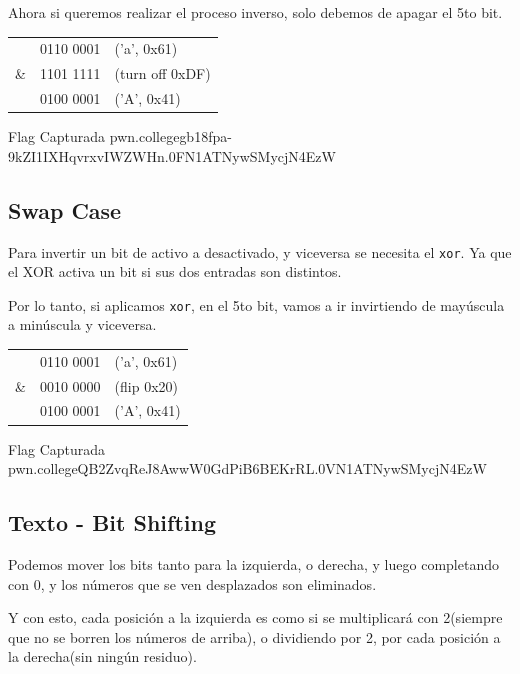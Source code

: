 Ahora si queremos realizar el proceso inverso, solo debemos de apagar el 5to bit.

\begin{center}
	\begin{tabular}{lcl}
		   & 0110 0001 & ('a', 0x61)     \\
		\& & 1101 1111 & (turn off 0xDF) \\
		\midrule
		   & 0100 0001 & ('A', 0x41)
	\end{tabular}
\end{center}

\begin{flagbox}{Flag Capturada}
	pwn.college{gb18fpa-9kZI1IXHqvrxvIWZWHn.0FN1ATNywSMycjN4EzW}
\end{flagbox}

\subsection{Swap Case}\label{subsec:swap_case}

Para invertir un bit de activo a desactivado, y viceversa se necesita el \texttt{xor}.
Ya que el XOR activa un bit si sus dos entradas son distintos.

Por lo tanto, si aplicamos \texttt{xor}, en el 5to bit, vamos a ir invirtiendo de mayúscula a minúscula
y viceversa.

\begin{center}
	\begin{tabular}{lcl}
		   & 0110 0001 & ('a', 0x61) \\
		\& & 0010 0000 & (flip 0x20) \\
		\midrule
		   & 0100 0001 & ('A', 0x41)
	\end{tabular}
\end{center}

\begin{flagbox}{Flag Capturada}
	pwn.college{QB2ZvqReJ8AwwW0GdPiB6BEKrRL.0VN1ATNywSMycjN4EzW}
\end{flagbox}

\subsection{Texto - Bit Shifting}\label{subsec:texto_bit_shifting}

Podemos mover los bits tanto para la izquierda, o derecha, y luego completando con 0,
y los números que se ven desplazados son eliminados.

Y con esto, cada posición a la izquierda es como si se multiplicará con 2(siempre que no se borren los números de arriba),
o dividiendo por 2, por cada posición a la derecha(sin ningún residuo).

